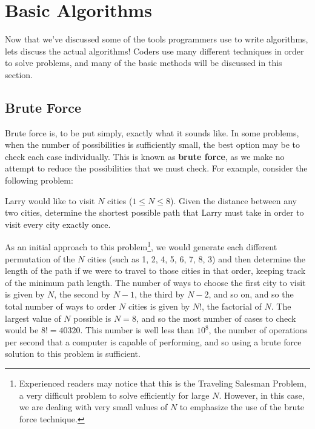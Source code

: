 \chapter{Basic Algorithms}

Now that we've discussed some of the tools programmers use to write algorithms, lets discuss the actual algorithms!  Coders use many different techniques in order to solve problems, and many of the basic methods will be discussed in this section.

\section{Brute Force}

Brute force is, to be put simply, exactly what it sounds like.  In some problems, when the number of possibilities is sufficiently small, the best option may be to check each case individually.  This is known as \textbf{brute force}, as we make no attempt to reduce the possibilities that we must check.  For example, consider the following problem:

\begin{Problem}
Larry would like to visit $ N $ cities ($1 \leq N \leq 8$).  Given the distance between any two cities, determine the shortest possible path that Larry must take in order to visit every city exactly once.
\end{Problem}

As an initial approach to this problem\footnote{Experienced readers may notice that this is the Traveling Salesman Problem, a very difficult problem to solve efficiently for large $ N $.  However, in this case, we are dealing with very small values of $ N $ to emphasize the use of the brute force technique.}, we would generate each different permutation of the $ N $ cities (such as 1, 2, 4, 5, 6, 7, 8, 3) and then determine the length of the path if we were to travel to those cities in that order, keeping track of the minimum path length.  The number of ways to choose the first city to visit is given by $ N $, the second by $ N - 1 $, the third by $ N - 2 $, and so on, and so the total number of ways to order $ N $ cities is given by $ N! $, the factorial of $ N $.  The largest value of $ N $ possible is $ N = 8 $, and so the most number of cases to check would be $ 8! = 40320 $.  This number is well less than $ 10^8 $, the number of operations per second that a computer is capable of performing, and so using a brute force solution to this problem is sufficient.

